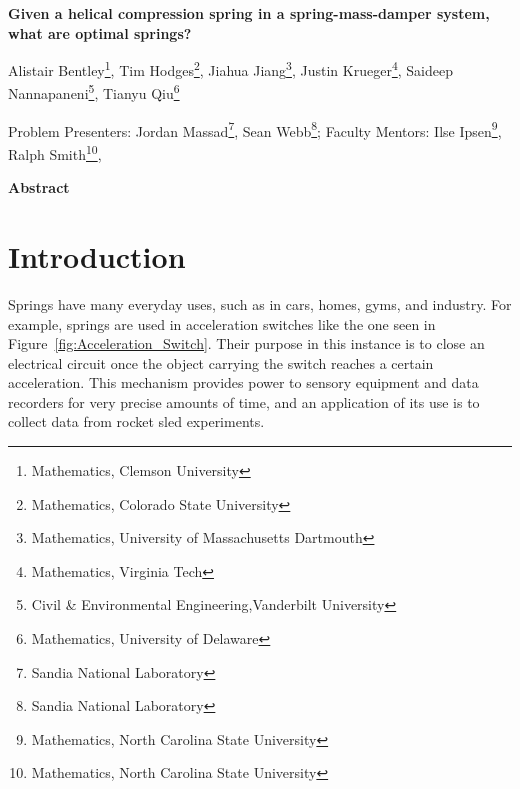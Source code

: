 \documentclass[10pt]{article}
\begin{document}
\centerline{\large \bf Given a helical compression spring in a spring-mass-damper system, what are optimal springs?}

\vspace{.1truein}

\def\thefootnote{\arabic{footnote}}
\begin{center}
  
  Alistair Bentley\footnote{Mathematics, Clemson University},
   Tim Hodges\footnote{Mathematics, Colorado State University},
   Jiahua Jiang\footnote{Mathematics, University of Massachusetts Dartmouth },
  Justin Krueger\footnote{Mathematics, Virginia Tech},
  Saideep Nannapaneni\footnote{Civil \& Environmental Engineering,Vanderbilt University},
  Tianyu Qiu\footnote{Mathematics, University of Delaware}
   
\end{center}



\begin{center}
Problem Presenters: Jordan Massad\footnote{Sandia National Laboratory},
Sean Webb\footnote{Sandia National Laboratory};
	Faculty Mentors: Ilse Ipsen\footnote{Mathematics, North Carolina State University},
	Ralph Smith\footnote{Mathematics, North Carolina State University}, 
\end{center}


\vspace{.3truein}
\centerline{\bf Abstract}





\section{Introduction}
\label{sec:Introduction}

Springs have many everyday uses, such as in cars, homes, gyms, and industry. For example, springs are used in acceleration switches like the one seen in Figure~\ref{fig:Acceleration_Switch}. Their purpose in this instance is to close an electrical circuit once the object carrying the switch reaches a certain acceleration. This mechanism provides power to sensory equipment and data recorders for very precise amounts of time, and an application of its use is to collect data from rocket sled experiments. 
\end{document}
